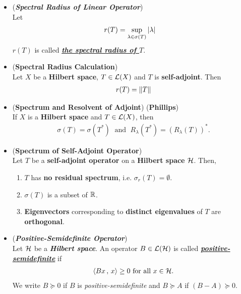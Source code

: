 \documentclass[11pt]{article}
\begin{document}
\begin{itemize}
\item \begin{definition} (\emph{\textbf{Spectral Radius of Linear Operator}})\\
Let 
\begin{align*}
r(T) &= \sup_{\lambda \in \sigma(T)} \left\lvert \lambda \right\rvert
\end{align*}
$r(T)$ is called  \underline{\textbf{\emph{the spectral radius of $T$}}}. 
\end{definition}

\item \begin{proposition} (\textbf{Spectral Radius Calculation}) \citep{reed1980methods}\\
Let $X$ be a  \textbf{Hilbert space}, $T \in {\mathcal L}(X)$ and $T$ is \textbf{self-adjoint}. Then 
\begin{align*}
r(T) = \left\|T\right\|_{}
\end{align*}
\end{proposition}

\item \begin{theorem} (\textbf{Spectrum and Resolvent of Adjoint}) (\textbf{Phillips}) \citep{reed1980methods}\\ 
If $X$ is a \textbf{Hilbert space} and $T \in {\mathcal L}(X)$, then 
\begin{align*}
\sigma(T) = \sigma(T^{*})\; \text{ and }\; R_{\lambda}(T^{*}) = (R_{\lambda}(T))^{*}.
\end{align*}
\end{theorem}

\item \begin{proposition}  (\textbf{Spectrum of Self-Adjoint Operator}) \citep{reed1980methods}\\ 
Let $Τ$ be a \textbf{self-adjoint operator} on a \textbf{Hilbert space} ${\mathcal H}$. Then, 
\begin{enumerate}
\item $T$ has \textbf{no residual spectrum}, i.e. $\sigma_{r}(T) = \emptyset$. 
\item $\sigma(T)$ is a subset of ${\mathbb R}$. 
\item \textbf{Eigenvectors} corresponding to \textbf{distinct eigenvalues} of $T$ are \textbf{orthogonal}. 
\end{enumerate}
\end{proposition}

\item \begin{definition} (\emph{\textbf{Positive-Semidefinite Operator}})\\
Let ${\mathcal H}$ be a \emph{\textbf{Hilbert space}}. An operator $B \in {\mathcal L}({\mathcal H})$ is called \underline{\emph{\textbf{positive-semidefinite}}} if 
\begin{align*}
\left\langle Bx\,,\, x \right\rangle \ge 0\text{ for all }x \in {\mathcal H}.
\end{align*}
We write $B \succeq 0$ if $Β$ is \emph{positive-semidefinite} and  $B \succeq A$ if $(B - A) \succeq 0$. 


\end{definition}
\end{itemize}
\end{document}
